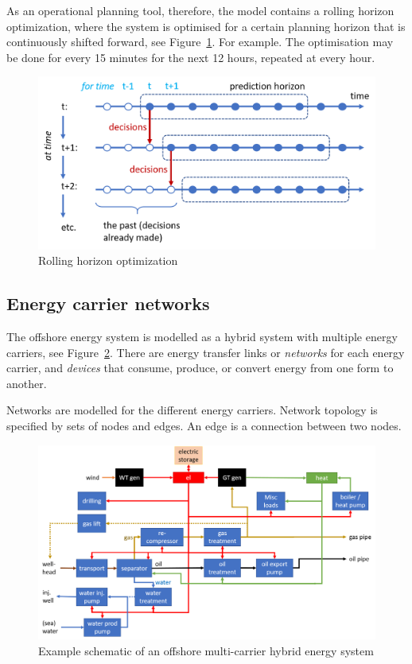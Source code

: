 \documentclass[12pt]{article}
\begin{document}
As an operational planning tool, therefore, the model contains a rolling horizon optimization, where the system is optimised for a certain planning horizon that is continuously shifted forward, see Figure~\ref{fig:rollinghorizon}. For example. The optimisation may be done for every 15 minutes for the next 12 hours, repeated at every hour.

\begin{figure}
\centering
	\includegraphics[width=\columnwidth]{media/optimisation_rollinghorizon.png}
\caption{Rolling horizon optimization}
\label{fig:rollinghorizon}
\end{figure}


\subsection{Energy carrier networks}

The offshore energy system is modelled as a hybrid system with multiple energy carriers, see Figure~\ref{fig:energy_system}.
There are energy transfer links or \emph{networks} for each energy carrier,
 and \emph{devices} that consume, produce, or convert energy from one form to another.


Networks are modelled for the different energy carriers. Network topology is specified by sets of nodes and edges. An edge is a connection between two nodes.


\begin{figure}
\centering
	\includegraphics[width=\columnwidth]{media/energy_system.png}
\caption{Example schematic of an offshore multi-carrier hybrid energy system}
\label{fig:energy_system}
\end{figure}
\end{document}

